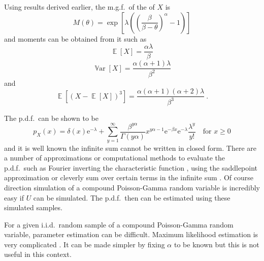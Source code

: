 \documentclass[12pt, a4paper]{memoir}
\DeclareMathOperator{\expectation}{\mathbb{E}}
\DeclareMathOperator{\variance}{\mathbb{V}ar}
\newcommand{\euler}{\mathrm{e}}
\begin{document}
Using results derived earlier, the m.g.f.~of the of $X$ is
\begin{equation}
M(\theta)=\exp\left[\lambda\left(\left(\frac{\beta}{\beta-\theta}\right)^{\alpha}-1\right)\right]
\end{equation}
and moments can be obtained from it such as
\begin{equation}
\expectation\left[X\right]=\frac{\alpha\lambda}{\beta}
\end{equation}
\begin{equation}
\variance\left[X\right]=\frac{\alpha(\alpha+1)\lambda}{\beta^2}
\label{eq:compoundPoisson_variance}
\end{equation}
and
\begin{equation}
\expectation\left[(X-\expectation[X])^3\right] = \frac{\alpha(\alpha+1)(\alpha+2)\lambda}{\beta^3} \ .
\end{equation}

The p.d.f.~can be shown to be
\begin{equation}
p_X(x) = 
\delta(x) \euler^{-\lambda}
+
\sum_{y=1}^{\infty}\frac{\beta^{y\alpha}}{\Gamma(y\alpha)}x^{y\alpha-1}\euler^{-\beta x}\euler^{-\lambda}\frac{\lambda^y}{y!}
\quad\text{for }x\geqslant 0
\label{eq:compoundPoisson_pdf}
\end{equation}
and it is well known the infinite sum cannot be written in closed form. There are a number of approximations or computational methods to evaluate the p.d.f.~such as Fourier inverting the characteristic function \citep{dunn2008evaluation}, using the saddlepoint approximation \citep{daniels1954saddlepoint} or cleverly sum over certain terms in the infinite sum \citep{dunn2005series}. Of course direction simulation of a compound Poisson-Gamma random variable is incredibly easy if $U$ can be simulated. The p.d.f.~then can be estimated using these simulated samples.

For a given i.i.d.~random sample of a compound Poisson-Gamma random variable, parameter estimation can be difficult. Maximum likelihood estimation is very complicated \citep{withers2011compound}. It can be made simpler by fixing $\alpha$ to be known \citep{withers2011compound} but this is not useful in this context.
\end{document}
